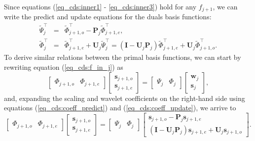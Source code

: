 \documentclass[graybox]{svmult}
\begin{document}
	
	Since equations (\ref{eq_cds:inner1} - \ref{eq_cds:inner3}) hold for any $f_{j+1}$, we can write the predict and update equations for the duals basis functions:
	\begin{eqnarray}
	\tilde{\Psi}_j^\intercal & = & \tilde{\Phi}_{j+1,o}^\intercal - \mathbf{P}_j \tilde{\Phi}_{j+1,e}^\intercal, \\
	\tilde{\Phi}_j^\intercal & = & \tilde{\Phi}_{j+1,e}^\intercal + \mathbf{U}_j \tilde{\Psi}_j^\intercal  =  (\mathbf{I} - \mathbf{U}_j\mathbf{P}_j) \tilde{\Phi}_{j+1,e}^\intercal + \mathbf{U}_j  \tilde{\Phi}_{j+1,o}^\intercal.
	\end{eqnarray}
	To derive similar relations between the primal basis functions, we can start by rewriting equation (\ref{eq_cds:f_in_j}) as
	\begin{equation}
	\begin{bmatrix} \Phi_{j+1,o} & \Phi_{j+1,e} \end{bmatrix} \begin{bmatrix} \mathbf{s}_{j+1,o} \\ \mathbf{s}_{j+1,e} \end{bmatrix} = 
	\begin{bmatrix}\Psi_j & \Phi_j \end{bmatrix} \begin{bmatrix} \mathbf{w}_j \\ \mathbf{s}_j \end{bmatrix},
	\end{equation}
	and, expanding the scaling and wavelet coefficients on the right-hand side using equations (\ref{eq_cds:coeff_predict}) and (\ref{eq_cds:coeff_update}), we arrive to
	\begin{equation}
	\begin{bmatrix} \Phi_{j+1,o} & \Phi_{j+1,e} \end{bmatrix} \begin{bmatrix} \mathbf{s}_{j+1,o} \\ \mathbf{s}_{j+1,e} \end{bmatrix} = 
	\begin{bmatrix}\Psi_j & \Phi_j \end{bmatrix} \begin{bmatrix}  \mathbf{s}_{j+1,o} - \mathbf{P}_j \mathbf{s}_{j+1,e} \\ (\mathbf{I} - \mathbf{U}_j \mathbf{P}_j)\mathbf{s}_{j+1,e} + \mathbf{U}_j \mathbf{s}_{j+1,o} \end{bmatrix}.
	\label{eq_cds:lifting_matrix_form}
	\end{equation}
\end{document}
